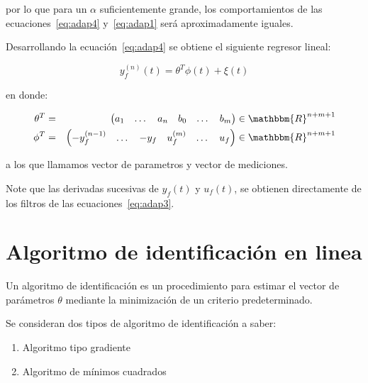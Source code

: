 
        por lo que para un $\alpha$ suficientemente grande, los comportamientos de las ecuaciones~\ref{eq:adap4} y~\ref{eq:adap1} será aproximadamente iguales.

        Desarrollando la ecuación~\ref{eq:adap4} se obtiene el siguiente regresor lineal:

        \begin{equation}
            y_f^{(n)}(t) = \theta^T \phi(t) + \xi(t)
        \end{equation}

        en donde:

        \begin{eqnarray} \label{eq:adap5}
            \theta^T & = & \begin{pmatrix} a_1 & \dots & a_n & b_0 & \dots & b_m \end{pmatrix} \in \mathbbm{R}^{n+m+1} \nonumber \\
            \phi^T & = & \begin{pmatrix} -y_f^{(n-1)} & \dots & -y_f & u_f^{(m)} & \dots & u_f \end{pmatrix} \in \mathbbm{R}^{n+m+1}
        \end{eqnarray}

        a los que llamamos vector de parametros y vector de mediciones.

        Note que las derivadas sucesivas de $y_f(t)$ y $u_f(t)$, se obtienen directamente de los filtros de las ecuaciones~\ref{eq:adap3}.



    \newpage
    \section{Algoritmo de identificación en linea}

        Un algoritmo de identificación es un procedimiento para estimar el vector de parámetros $\theta$ mediante la minimización de un criterio predeterminado.

        Se consideran dos tipos de algoritmo de identificación a saber:

        \begin{enumerate}
            \item Algoritmo tipo gradiente
            \item Algoritmo de mínimos cuadrados
        \end{enumerate}

